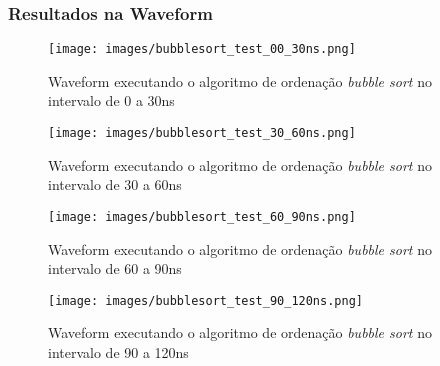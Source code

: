 \documentclass{article}
\begin{document}
			\subsubsection[Waveform]{Resultados na Waveform}
				\begin{figure}[H]
					\centering
					\caption[Waveform Algoritmo bubble sort 30ns]{Waveform executando o algoritmo de ordena\c{c}\~{a}o \textit{bubble sort} no intervalo de 0 a 30ns}
					\label{fig:Bubblesort_test_00_30ns}
					\texttt{[image: images/bubblesort\_test\_00\_30ns.png]}
				\end{figure}
			
				\begin{figure}[H]
					\centering
					\caption[Waveform Algoritmo bubble sort 60ns]{Waveform executando o algoritmo de ordena\c{c}\~{a}o \textit{bubble sort} no intervalo de 30 a 60ns}
					\label{fig:Bubblesort_test_30_60ns}
					\texttt{[image: images/bubblesort\_test\_30\_60ns.png]}
				\end{figure}
			
				\begin{figure}[H]
					\centering
					\caption[Waveform Algoritmo bubble sort 90ns]{Waveform executando o algoritmo de ordena\c{c}\~{a}o \textit{bubble sort} no intervalo de 60 a 90ns}
					\label{fig:Bubblesort_test_60_90ns}
					\texttt{[image: images/bubblesort\_test\_60\_90ns.png]}
				\end{figure}
			
				\begin{figure}[H]
					\centering
					\caption[Waveform Algoritmo bubble sort 120ns]{ Waveform executando o algoritmo de ordena\c{c}\~{a}o \textit{bubble sort} no intervalo de 90 a 120ns}
					\label{fig:Bubblesort_test_90_120ns}
					\texttt{[image: images/bubblesort\_test\_90\_120ns.png]}
				\end{figure}
			
			
	
	\cleardoublepage
\end{document}
